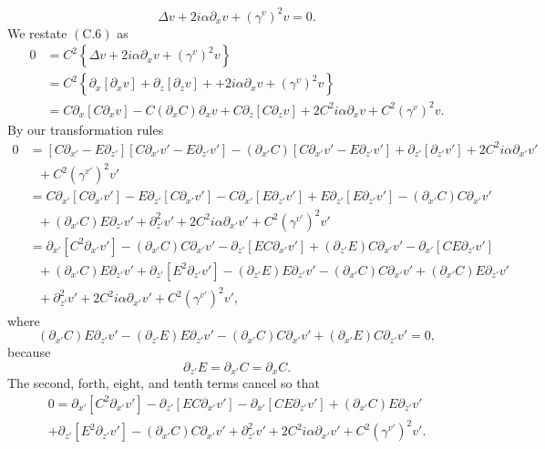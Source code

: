 \vspace{-1mm}
\begin{equation}\Delta v +2i\alpha\partial_{x}v+(\gamma^v)^2 v=0.\end{equation}
We restate $(\text{C}.6)$ as
\begin{align*}0&=C^2\left\{\Delta v +2i\alpha\partial_{x}v+(\gamma^v)^2v\right\}\\&=
C^2\left\{\partial_{x}[\partial_{x} v]+ \partial_{z}[\partial_{z} v]+ +2i\alpha\partial_{x}v+(\gamma^v)^2v\right\}\\&=
C\partial_{x}[C\partial_{x} v]-C(\partial_{x} C)\partial_{x} v + C\partial_{z}[C\partial_{z} v] + 2C^2i\alpha\partial_{x}v+C^2(\gamma^v)^2v.
\end{align*}
By our transformation rules
\begin{align*}0&=
[C\partial_{x'}-E\partial_{z'}][C\partial_{x'}v' - E\partial_{z'}v']-(\partial_{x'}C)[C\partial_{x'}v' - E\partial_{z'}v']+\partial_{z'}[\partial_{z'}v'] + 2C^2i\alpha\partial_{x'}v'\\&~~~+C^2(\gamma^{v'})^2v'\\&=
C\partial_{x'}[C\partial_{x'}v']-E\partial_{z'}[C\partial_{x'}v']-C\partial_{x'}[E\partial_{z'}v']+E\partial_{z'}[E\partial_{z'}v']-(\partial_{x'}C)C\partial_{x'}v' \\&
~~~+(\partial_{x'}C)E\partial_{z'}v'+\partial_{z'}^2v'+2C^2i\alpha\partial_{x'}v'+C^2(\gamma^{v'})^2v'\\&=
\partial_{x'}[C^2\partial_{x'}v']-(\partial_{x'}C)C\partial_{x'}v'-\partial_{z'}[EC\partial_{x'}v']+(\partial_{z'}E)C\partial_{x'}v'-\partial_{x'}[CE\partial_{z'}v']\\&~~~+(\partial_{x'}C)E\partial_{z'}v'
+\partial_{z'}[E^2\partial_{z'}v']-(\partial_{z'}E)E\partial_{z'}v'-(\partial_{x'}C)C\partial_{x'}v' + (\partial_{x'}C)E\partial_{z'}v'\\&~~~+\partial_{z'}^2v'+2C^2i\alpha\partial_{x'}v'+C^2(\gamma^{v'})^2v',
\end{align*}
where
$$(\partial_{x'}C)E\partial_{z'}v' -(\partial_{z'}E)E\partial_{z'}v'-(\partial_{x'}C)C\partial_{x'}v' + (\partial_{x'}E)C\partial_{z'}v' = 0,$$ 
because
$$\partial_{z'}E=\partial_{x'}C=\partial_x C.$$
The second, forth, eight, and tenth terms cancel so that
\begin{align*}0=\partial_{x'}[C^2\partial_{x'}v']-\partial_{z'}[EC\partial_{x'}v']-\partial_{x'}[CE\partial_{z'}v']+(\partial_{x'}C)E\partial_{z'}v' \\+\partial_{z'}[E^2\partial_{z'}v']-(\partial_{x'}C)C\partial_{x'}v' +\partial_{z'}^2v'+2C^2i\alpha\partial_{x'}v'+C^2(\gamma^{v'})^2v'.\end{align*}
